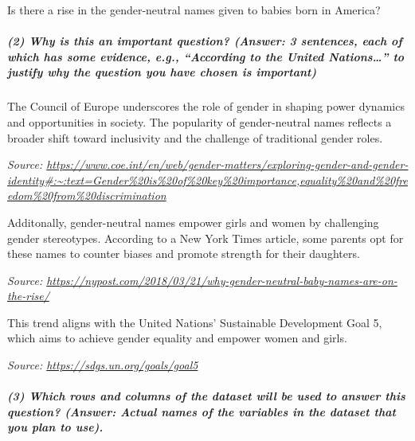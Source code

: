 \documentclass[
]{article}
\begin{document}
Is there a rise in the gender-neutral names given to babies born in
America?

\hypertarget{why-is-this-an-important-question-answer-3-sentences-each-of-which-has-some-evidence-e.g.-according-to-the-united-nations-to-justify-why-the-question-you-have-chosen-is-important}{%
\subparagraph{\texorpdfstring{\textbf{(2) Why is this an important
question? (Answer: 3 sentences, each of which has some evidence, e.g.,
``According to the United Nations\ldots{}'' to justify why the question
you have chosen is
important)}}{(2) Why is this an important question? (Answer: 3 sentences, each of which has some evidence, e.g., ``According to the United Nations\ldots'' to justify why the question you have chosen is important)}}\label{why-is-this-an-important-question-answer-3-sentences-each-of-which-has-some-evidence-e.g.-according-to-the-united-nations-to-justify-why-the-question-you-have-chosen-is-important}}

The Council of Europe underscores the role of gender in shaping power
dynamics and opportunities in society. The popularity of gender-neutral
names reflects a broader shift toward inclusivity and the challenge of
traditional gender roles.

\emph{Source:
\url{https://www.coe.int/en/web/gender-matters/exploring-gender-and-gender-identity\#:~:text=Gender\%20is\%20of\%20key\%20importance,equality\%20and\%20freedom\%20from\%20discrimination}}

Additonally, gender-neutral names empower girls and women by challenging
gender stereotypes. According to a New York Times article, some parents
opt for these names to counter biases and promote strength for their
daughters.

\emph{Source:
\url{https://nypost.com/2018/03/21/why-gender-neutral-baby-names-are-on-the-rise/}}

This trend aligns with the United Nations' Sustainable Development Goal
5, which aims to achieve gender equality and empower women and girls.

\emph{Source: \url{https://sdgs.un.org/goals/goal5}}

\hypertarget{which-rows-and-columns-of-the-dataset-will-be-used-to-answer-this-question-answer-actual-names-of-the-variables-in-the-dataset-that-you-plan-to-use.}{%
\subparagraph{\texorpdfstring{\textbf{(3) Which rows and columns of the
dataset will be used to answer this question? (Answer: Actual names of
the variables in the dataset that you plan to
use).}}{(3) Which rows and columns of the dataset will be used to answer this question? (Answer: Actual names of the variables in the dataset that you plan to use).}}\label{which-rows-and-columns-of-the-dataset-will-be-used-to-answer-this-question-answer-actual-names-of-the-variables-in-the-dataset-that-you-plan-to-use.}}
\end{document}

